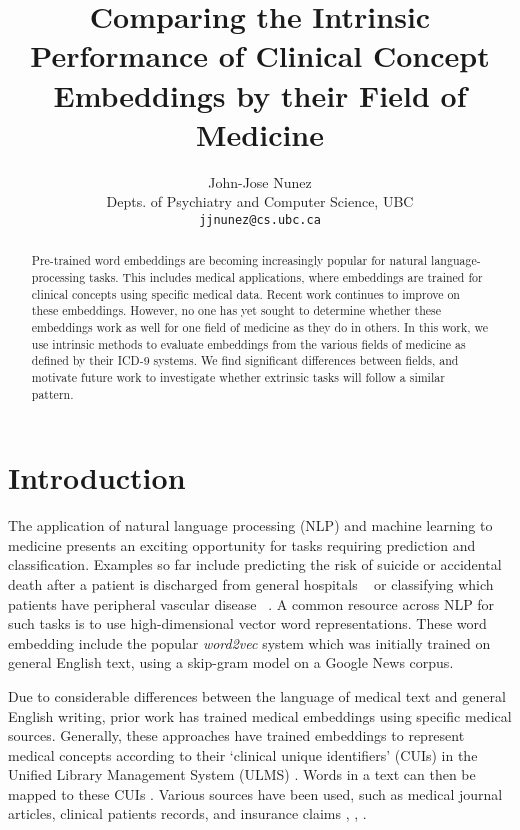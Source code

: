 \documentclass[11pt,a4paper]{article}
\title{Comparing the Intrinsic Performance of Clinical Concept Embeddings by their Field of Medicine}
\author{John-Jose Nunez\\
  Depts. of Psychiatry and Computer Science, UBC\\
  {\tt jjnunez@cs.ubc.ca} 
}
\date{}
\begin{document}
\maketitle
\begin{abstract}
	Pre-trained word embeddings are becoming increasingly popular for natural language-processing tasks. This includes medical applications, where embeddings are trained for clinical concepts using specific medical data. Recent work continues to improve on these embeddings. However, no one has yet sought to determine whether these embeddings work as well for one field of medicine as they do in others. In this work, we use intrinsic methods to evaluate embeddings from the various fields of medicine as defined by their ICD-9 systems. We find significant differences between fields, and motivate future work to investigate whether extrinsic tasks will follow a similar pattern. 
\end{abstract}

\section{Introduction}


The application of natural language processing (NLP) and machine learning to medicine presents an exciting opportunity for tasks requiring prediction and classification. Examples so far include predicting the risk of suicide or accidental death after a patient is discharged from general hospitals ~\cite{mccoyImprovingPredictionSuicide2016} or classifying which patients have peripheral vascular disease ~\cite{afzalMiningPeripheralArterial2017}. A common resource across NLP for such tasks is to use high-dimensional vector word representations. These word embedding include the popular \emph{word2vec} system \cite{mikolovEfficientEstimationWord2013} which was initially trained on general English text, using a skip-gram model on a Google News corpus.

Due to considerable differences between the language of medical text and general English writing, prior work has trained medical embeddings using specific medical sources. Generally, these approaches have trained embeddings to represent medical concepts according to their `clinical unique identifiers' (CUIs) in the Unified Library Management System (ULMS) \cite{bodenreiderUnifiedMedicalLanguage2004}. Words in a text can then be mapped to these CUIs \cite{yuShortIntroductionNILE2013}. Various sources have been used, such as medical journal articles, clinical patients records, and insurance claims \cite{devineMedicalSemanticSimilarity2014}, \cite{minarro-gimenezExploringApplicationDeep2014},  \cite{choiLearningLowDimensionalRepresentations2016}.  
\end{document}
